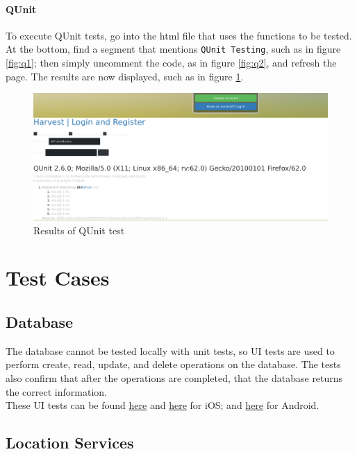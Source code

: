 \documentclass[12pt]{article}
\begin{document}
\paragraph{QUnit} To execute QUnit tests, go into the html file that uses the functions to be tested. At the bottom, find a segment that mentions \texttt{QUnit Testing}, such as in figure \ref{fig:q1}; then simply uncomment the code, as in figure \ref{fig:q2}, and refresh the page. The results are now displayed, such as in figure \ref{fig:qr}.

\begin{figure}
\includegraphics[width=\textwidth]{images/qr.png}
\caption{Results of QUnit test}
\label{fig:qr}
\end{figure}

\section{Test Cases}
\subsection{Database}
The database cannot be tested locally with unit tests, so UI tests are used to perform create, read, update, and delete operations on the database. The tests also confirm that after the operations are completed, that the database returns the correct information.\\
\indent These UI tests can be found \href{https://github.com/BinaryNinjaz/COS301-Capstone/blob/master/Source/iOS/Harvest/HarvestUITests/HarvestEntityCreationUITests.swift}{here} and \href{https://github.com/BinaryNinjaz/COS301-Capstone/blob/master/Source/iOS/Harvest/HarvestUITests/HarvestEntityDeletionUITests.swift}{here} for iOS; and \href{https://github.com/BinaryNinjaz/COS301-Capstone/blob/master/Source/Android/Harvest/app/src/androidTest/java/za/org/samac/harvest/InformationTest.java}{here} for Android.
\subsection{Location Services}
\end{document}
